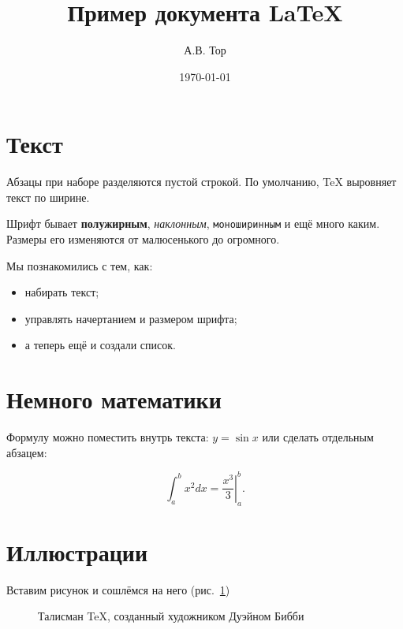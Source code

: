 \documentclass[12pt]{article}
\begin{document}
\title{Пример документа LaTeX}
\author{А.В. Тор}
\date{\today}
\maketitle


\section{Текст}

Абзацы при наборе разделяются пустой строкой. По умолчанию, TeX выровняет текст по ширине. 

Шрифт бывает \textbf{полужирным}, \textit{наклонным}, \texttt{моноширинным} и ещё много каким. Размеры его изменяются от {\tiny малюсенького} до {\Huge огромного}.

Мы познакомились с тем, как:

\begin{itemize}
\item набирать текст;
\item управлять начертанием и размером шрифта;
\item а теперь ещё и создали список.
\end{itemize}

\section{Немного математики}

Формулу можно поместить внутрь текста: \( y=\sin x \) или сделать отдельным абзацем:

\[
\int_a^b x^2 dx = \left. \frac{x^3}{3} \right|_a^b .
\]

\section{Иллюстрации}

Вставим рисунок и сошлёмся на него (рис.~\ref{lion})

\begin{figure}[h]
\caption{Талисман \TeX, созданный художником Дуэйном Бибби}
\label{lion}
\end{figure}
\end{document}
